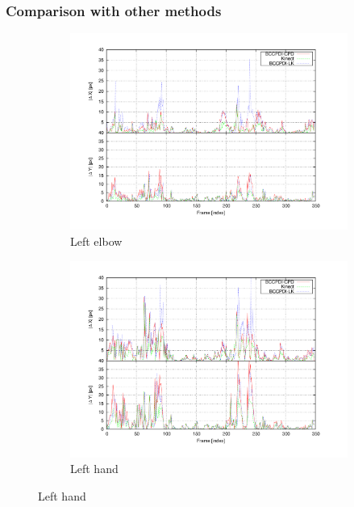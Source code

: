 \subsubsection{Comparison with other methods}\label{ch:chapter02_02_03_03}

\begin{figure}[t]
        \centering

        \begin{subfigure}[b]{0.5\columnwidth}
                \centering
                \includegraphics[width=\textwidth, trim=50 40 80 40,clip]{fig27.pdf}
                \caption{Left elbow}
                \label{fig:cp02_comparison_left_elbow}
        \end{subfigure}%
        \begin{subfigure}[b]{0.5\columnwidth}
                \centering
		  \includegraphics[width=\textwidth, trim=50 40 80 40,clip]{fig28.pdf}
                \caption{Left hand}
                \label{fig:cp02_comparison_left_hand}
        \end{subfigure}%


\end{figure}

